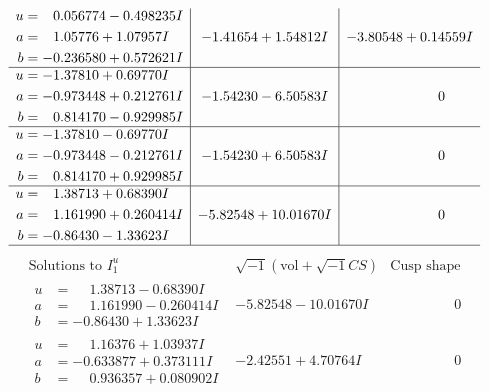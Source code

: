 \documentclass[1p]{elsarticle_modified}
\theoremstyle{definition}
\newcommand{\I}{\sqrt{-1}}
\begin{document}
$$\begin{array}{c|c|c}
\begin{aligned}
u &= \phantom{-}0.056774 - 0.498235 I \\
a &= \phantom{-}1.05776 + 1.07957 I \\
b &= -0.236580 + 0.572621 I\end{aligned}
 & -1.41654 + 1.54812 I & -3.80548 + 0.14559 I \\ \hline\begin{aligned}
u &= -1.37810 + 0.69770 I \\
a &= -0.973448 + 0.212761 I \\
b &= \phantom{-}0.814170 - 0.929985 I\end{aligned}
 & -1.54230 - 6.50583 I & \phantom{-0.000000 } 0 \\ \hline\begin{aligned}
u &= -1.37810 - 0.69770 I \\
a &= -0.973448 - 0.212761 I \\
b &= \phantom{-}0.814170 + 0.929985 I\end{aligned}
 & -1.54230 + 6.50583 I & \phantom{-0.000000 } 0 \\ \hline\begin{aligned}
u &= \phantom{-}1.38713 + 0.68390 I \\
a &= \phantom{-}1.161990 + 0.260414 I \\
b &= -0.86430 - 1.33623 I\end{aligned}
 & -5.82548 + 10.01670 I & \phantom{-0.000000 } 0\\
 \hline 
 \end{array}$$\newpage$$\begin{array}{c|c|c}  
\text{Solutions to }I^u_{1}& \I (\text{vol} + \sqrt{-1}CS) & \text{Cusp shape}\\
 \hline 
\begin{aligned}
u &= \phantom{-}1.38713 - 0.68390 I \\
a &= \phantom{-}1.161990 - 0.260414 I \\
b &= -0.86430 + 1.33623 I\end{aligned}
 & -5.82548 - 10.01670 I & \phantom{-0.000000 } 0 \\ \hline\begin{aligned}
u &= \phantom{-}1.16376 + 1.03937 I \\
a &= -0.633877 + 0.373111 I \\
b &= \phantom{-}0.936357 + 0.080902 I\end{aligned}
 & -2.42551 + 4.70764 I & \phantom{-0.000000 } 0 \\ \hline\begin{aligned}

\end{aligned}
\end{array}$$
\end{document}
